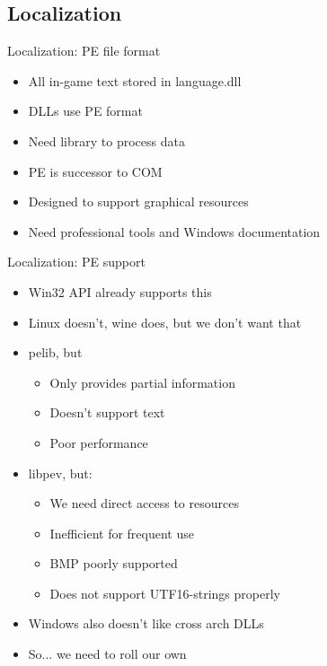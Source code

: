 \documentclass{beamer}
\begin{document}

\subsection{Localization}

\begin{frame}{Localization: PE file format}
	\begin{itemize}
		\item All in-game text stored in language.dll
		\item DLLs use PE format
		\item Need library to process data
		\item PE is successor to COM
		\item Designed to support graphical resources
		\item Need professional tools and Windows documentation
	\end{itemize}
\end{frame}


\begin{frame}{Localization: PE support}
	\begin{itemize}
		\item Win32 API already supports this
		\item Linux doesn't, wine does, but we don't want that
		\item pelib, but
		\begin{itemize}
			\item Only provides partial information
			\item Doesn't support text
			\item Poor performance
		\end{itemize}
		\item libpev, but:
		\begin{itemize}
			\item We need direct access to resources
			\item Inefficient for frequent use
			\item BMP poorly supported
			\item Does not support UTF16-strings properly
		\end{itemize}
		\item Windows also doesn't like cross arch DLLs
		\item So... we need to roll our own
	\end{itemize}
\end{frame}
\end{document}
